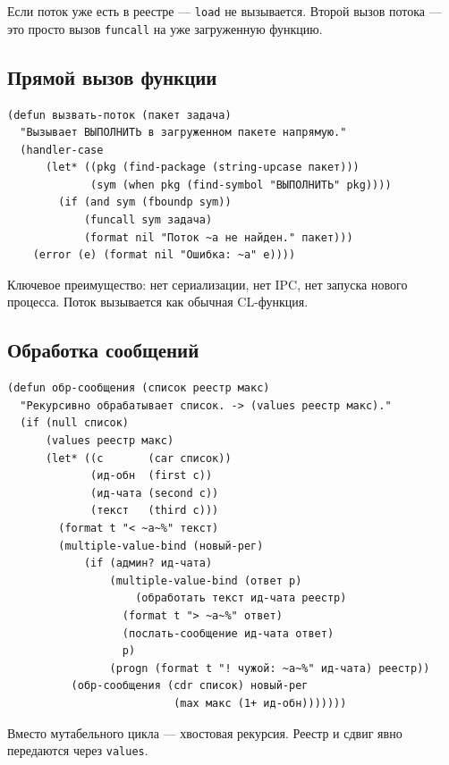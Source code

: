 \documentclass[11pt,a4paper]{article}
\begin{document}
Если поток уже есть в реестре — \texttt{load} не вызывается. Второй вызов потока — это просто вызов \texttt{funcall} на уже загруженную функцию.

\subsection{Прямой вызов функции}

\begin{lstlisting}[caption={подмастерье/main.lisp — вызов без subprocess}]
(defun вызвать-поток (пакет задача)
  "Вызывает ВЫПОЛНИТЬ в загруженном пакете напрямую."
  (handler-case
      (let* ((pkg (find-package (string-upcase пакет)))
             (sym (when pkg (find-symbol "ВЫПОЛНИТЬ" pkg))))
        (if (and sym (fboundp sym))
            (funcall sym задача)
            (format nil "Поток ~a не найден." пакет)))
    (error (e) (format nil "Ошибка: ~a" e))))
\end{lstlisting}

Ключевое преимущество: нет сериализации, нет IPC, нет запуска нового процесса. Поток вызывается как обычная CL-функция.

\subsection{Обработка сообщений}

\begin{lstlisting}[caption={подмастерье/main.lisp — рекурсивная обработка списка}]
(defun обр-сообщения (список реестр макс)
  "Рекурсивно обрабатывает список. -> (values реестр макс)."
  (if (null список)
      (values реестр макс)
      (let* ((с       (car список))
             (ид-обн  (first с))
             (ид-чата (second с))
             (текст   (third с)))
        (format t "< ~a~%" текст)
        (multiple-value-bind (новый-рег)
            (if (админ? ид-чата)
                (multiple-value-bind (ответ р)
                    (обработать текст ид-чата реестр)
                  (format t "> ~a~%" ответ)
                  (послать-сообщение ид-чата ответ)
                  р)
                (progn (format t "! чужой: ~a~%" ид-чата) реестр))
          (обр-сообщения (cdr список) новый-рег
                          (max макс (1+ ид-обн)))))))
\end{lstlisting}

Вместо мутабельного цикла — хвостовая рекурсия. Реестр и сдвиг явно передаются через \texttt{values}.

\end{document}
